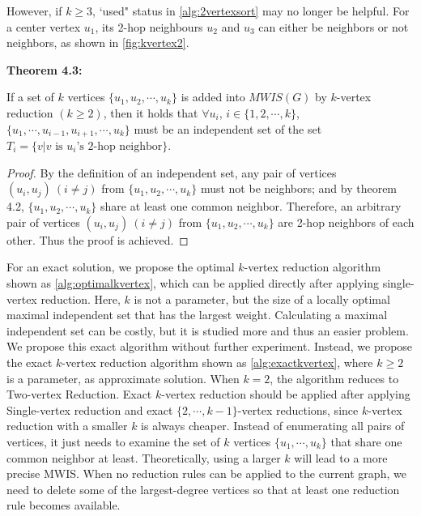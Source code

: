 \documentclass[sigconf, nonacm]{acmart}
\begin{document}
However, if $k\geq 3$, `used" status in \autoref{alg:2vertexsort} may no longer be helpful. For a center vertex $u_1$, its 2-hop neighbours $u_2$ and $u_3$ can either be neighbors or not neighbors, as shown in \autoref{fig:kvertex2}.

\begin{framed}
\noindent\textbf{Theorem 4.3:}

If a set of $k$ vertices $\{u_1, u_2, \cdots, u_k\}$ is added into $MWIS(G)$ by $k$-vertex reduction $(k\geq 2)$, then it holds that $\forall u_i$, $i\in\{1,2,\cdots,k\}$, $\{u_1, \cdots, u_{i-1}, u_{i+1}, \cdots, u_k\}$ must be an independent set of the set $T_i=\{v | v \text{ is }u_i\text{'s 2-hop neighbor}\}$.
\end{framed}

\begin{proof}
By the definition of an independent set, any pair of vertices $(u_i, u_j)\ (i\neq j)$ from $\{u_1, u_2, \cdots, u_k\}$ must not be neighbors; and by theorem 4.2, $\{u_1, u_2, \cdots, u_k\}$ share at least one common neighbor. Therefore, an arbitrary pair of vertices $(u_i, u_j)\ (i\neq j)$ from $\{u_1, u_2, \cdots, u_k\}$ are 2-hop neighbors of each other. Thus the proof is achieved.
\end{proof}

For an exact solution, we propose the optimal $k$-vertex reduction algorithm shown as \autoref{alg:optimalkvertex}, which can be applied directly after applying single-vertex reduction. Here, $k$ is not a parameter, but the size of a locally optimal maximal independent set that has the largest weight. Calculating a maximal independent set can be costly, but it is studied more and thus an easier problem. We propose this exact algorithm without further experiment. Instead, we propose the exact $k$-vertex reduction algorithm shown as \autoref{alg:exactkvertex}, where $k\geq 2$ is a parameter, as approximate solution. When $k=2$, the algorithm reduces to Two-vertex Reduction. Exact $k$-vertex reduction should be applied after applying Single-vertex reduction and exact $\{2,\cdots,k-1\}$-vertex reductions, since $k$-vertex reduction with a smaller $k$ is always cheaper. Instead of enumerating all pairs of vertices, it just needs to examine the set of $k$ vertices $\{u_1,\cdots,u_k\}$ that share one common neighbor at least. Theoretically, using a larger $k$ will lead to a more precise MWIS. When no reduction rules can be applied to the current graph, we need to delete some of the largest-degree vertices so that at least one reduction rule becomes available.
\end{document}

